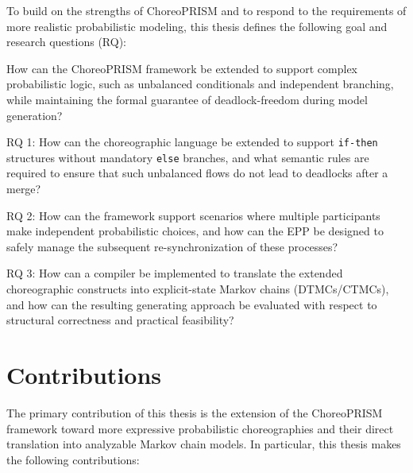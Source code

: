 To build on the strengths of ChoreoPRISM and to respond to the requirements of more realistic probabilistic modeling, this thesis defines the following goal and research questions (RQ):

\begin{tcolorbox}[
	colback=white,
	colframe=black,
	title=Thesis Goal,
	fonttitle=\bfseries,
	boxrule=0.4pt,
	arc=1mm
	]
How can the ChoreoPRISM framework be extended to support complex probabilistic logic, such as unbalanced conditionals and independent branching, while maintaining the formal guarantee of deadlock-freedom during model generation?	
\end{tcolorbox}
\begin{description}
\item{RQ 1: How can the choreographic language be extended to support \texttt{if-then} structures without mandatory \texttt{else} branches, and what semantic rules are required to ensure that such unbalanced flows do not lead to deadlocks after a merge?} 

\item{RQ 2: How can the framework support scenarios where multiple participants make independent probabilistic choices, and how can the EPP be designed to safely manage the subsequent re-synchronization of these processes?}

\item{RQ 3: How can a compiler be implemented to translate the extended choreographic constructs into explicit-state Markov chains (DTMCs/CTMCs), and how can the resulting generating approach be evaluated with respect to structural correctness and practical feasibility?}
\end{description}

\section{Contributions}
The primary contribution of this thesis is the extension of the ChoreoPRISM framework toward more expressive probabilistic choreographies and their direct translation into analyzable Markov chain models. In particular, this thesis makes the following contributions:


